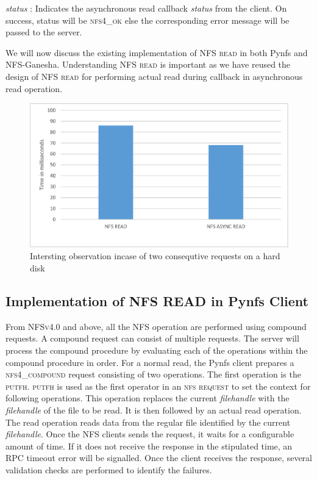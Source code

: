 \noindent\textit{status} : Indicates the asynchronous read callback \textit{status} from the client. On success, status will be \textsc{nfs4\_ok} else the corresponding error message will be passed to the server.


We will now discuss the existing implementation of \textsc{NFS read} in both Pynfs and NFS-Ganesha. Understanding \textsc{NFS read} is important as we have reused the design of \textsc{NFS read} for performing actual read during callback in asynchronous read operation.


\begin{figure}
\centering
\includegraphics[scale=1.0]{figures/InterstingObservation.eps}
\caption{Intersting observation incase of two consequtive requests on a hard disk}
\label{fig:InterstingObservation}
\end{figure}

\subsection{Implementation of NFS READ in Pynfs Client}
 
From \textsc{NFSv4.0} and above, all the NFS operation are performed using compound requests. A compound request can consist of multiple requests. The server will process the compound procedure by evaluating each of the operations within the compound procedure in order. For a normal read, the Pynfs client prepares a \textsc{nfs4\_compound} request consisting of two operations. The first operation is the \textsc{putfh}. \textsc{putfh} is used as the first operator in an \textsc{nfs request} to set the context for following operations. This operation replaces the current \textit{filehandle} with the \textit{filehandle} of the file to be read. It is then followed by an actual read operation. The read operation reads data from the regular file identified by the current \textit{filehandle}. Once the NFS clients sends the request, it waits for a configurable amount of time. If it does not receive the response in the stipulated time, an RPC timeout error will be signalled. Once the client receives the response, several validation checks are performed to identify the failures.



